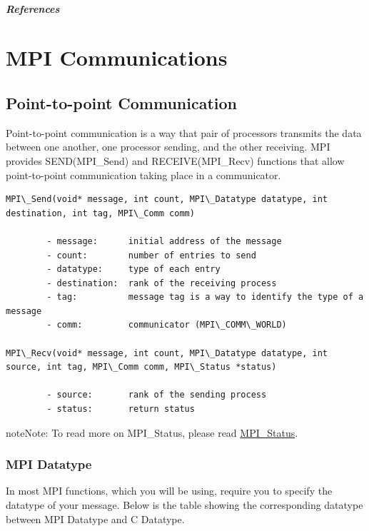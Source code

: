 \documentclass[letterpaper,10pt,openany,oneside]{sphinxmanual}
\begin{document}
\paragraph{References}


\chapter{MPI Communications}
\label{MPICommunication/MPICommunication:mpi-communications}\label{MPICommunication/MPICommunication::doc}

\section{Point-to-point Communication}
\label{MPICommunication/MPICommunication:point-to-point-communication}
Point-to-point communication is a way that pair of processors transmits the data between one another, one processor sending, and the other receiving. MPI provides SEND(MPI\_Send) and RECEIVE(MPI\_Recv) functions that allow point-to-point communication taking place in a communicator.

\begin{Verbatim}[commandchars=\\\{\}]
MPI\_Send(void* message, int count, MPI\_Datatype datatype, int destination, int tag, MPI\_Comm comm)

        - message:      initial address of the message
        - count:        number of entries to send
        - datatype:     type of each entry
        - destination:  rank of the receiving process
        - tag:          message tag is a way to identify the type of a message
        - comm:         communicator (MPI\_COMM\_WORLD)

MPI\_Recv(void* message, int count, MPI\_Datatype datatype, int source, int tag, MPI\_Comm comm, MPI\_Status *status)

        - source:       rank of the sending process
        - status:       return status
\end{Verbatim}

\begin{notice}{note}{Note:}
To read more on MPI\_Status, please read \href{http://www.netlib.org/utk/papers/mpi-book/node31.html}{MPI\_Status}.
\end{notice}


\subsection{MPI Datatype}
\label{MPICommunication/MPICommunication:mpi-datatype}
In most MPI functions, which you will be using, require you to specify the datatype of your message. Below is the table showing the corresponding datatype between MPI Datatype and C Datatype.
\end{document}
